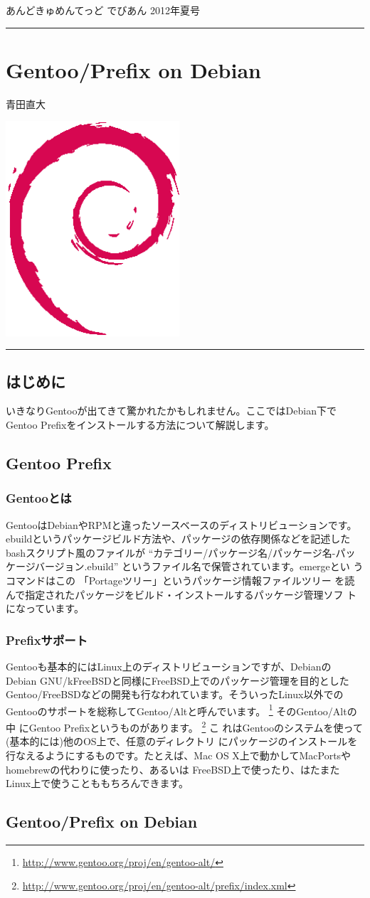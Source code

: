 \documentclass[mingoth,a4paper]{jsarticle}
\renewcommand{\dancersection}[2]{%
\newpage
あんどきゅめんてっど でびあん 2012年夏号
%
\vspace{0.1mm}\\
{\color{dancerdarkblue}\rule{\hsize}{2mm}}

%
%
\begin{minipage}[t]{0.6\hsize}
\color{dancerdarkblue}
\vspace{1cm}
\section{#1}
\hfill{}#2\\
\end{minipage}
\begin{minipage}[t]{0.4\hsize}
\vspace{-2cm}
\hfill{}\includegraphics[height=8cm]{image200502/openlogo-nd.eps}\\
\vspace{-5cm}
\end{minipage}
%
{\color{dancerlightblue}\rule{0.66\hsize}{2mm}}
%
\vspace{2cm}
}
\begin{document}
\clearpage
\newpage

\dancersection{Gentoo/Prefix on Debian}{青田直大}
\label{sec:gentoo}

\subsection{はじめに}

いきなりGentooが出てきて驚かれたかもしれません。ここではDebian下で
Gentoo Prefixをインストールする方法について解説します。

\subsection{Gentoo Prefix}
\subsubsection{Gentooとは}
GentooはDebianやRPMと違ったソースベースのディストリビューションです。
ebuildというパッケージビルド方法や、パッケージの依存関係などを記述した
bashスクリプト風のファイルが
``カテゴリー/パッケージ名/パッケージ名-パッケージバージョン.ebuild''
というファイル名で保管されています。emergeとい
うコマンドはこの 「Portageツリー」というパッケージ情報ファイルツリー
を読んで指定されたパッケージをビルド・インストールするパッケージ管理ソフ
トになっています。

\subsubsection{Prefixサポート}

Gentooも基本的にはLinux上のディストリビューションですが、Debianの
Debian GNU/kFreeBSDと同様にFreeBSD上でのパッケージ管理を目的とした
Gentoo/FreeBSDなどの開発も行なわれています。そういったLinux以外での
Gentooのサポートを総称してGentoo/Altと呼んでいます。
\footnote{\url{http://www.gentoo.org/proj/en/gentoo-alt/}} そのGentoo/Altの中
にGentoo Prefixというものがあります。
\footnote{\url{http://www.gentoo.org/proj/en/gentoo-alt/prefix/index.xml}} こ
れはGentooのシステムを使って(基本的には)他のOS上で、任意のディレクトリ
にパッケージのインストールを行なえるようにするものです。たとえば、Mac
OS X上で動かしてMacPortsやhomebrewの代わりに使ったり、あるいは
FreeBSD上で使ったり、はたまたLinux上で使うことももちろんできます。

\subsection{Gentoo/Prefix on Debian}
\end{document}

